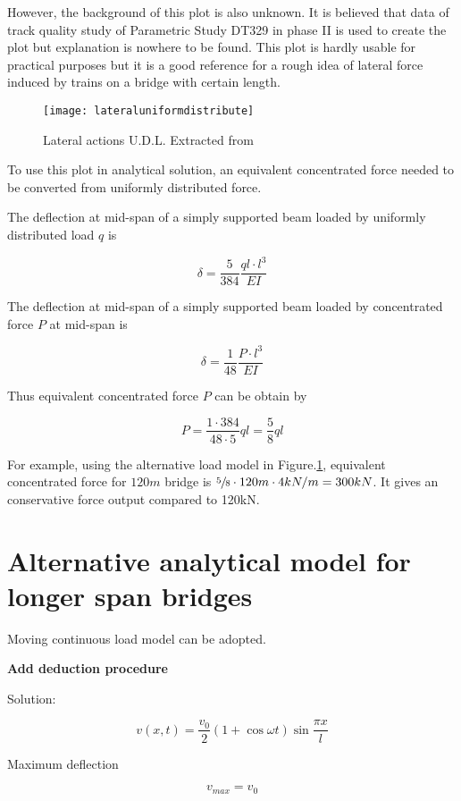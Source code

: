 However, the background of this plot is also unknown. It is believed that data of track quality study of Parametric Study DT329\cite{d181dt329} in phase II is used to create the plot but explanation is nowhere to be found. This plot is hardly usable for practical purposes but it is a good reference for a rough idea of lateral force induced by trains on a bridge with certain length.

\begin{figure}[h!]
    \centering
    \texttt{[image: lateraluniformdistribute]}
    \caption{Lateral actions U.D.L. Extracted from \cite[Figure.4.1]{d181} }
    \label{fig:lateralUDL}
\end{figure}

To use this plot in analytical solution, an equivalent concentrated force needed to be converted from uniformly distributed force.

The deflection at mid-span of a simply supported beam loaded by uniformly distributed load $q$ is

$$ \delta = \frac{5}{384} \frac{ql\cdot l^3}{EI} $$

The deflection at mid-span of a simply supported beam loaded by concentrated force $P$ at mid-span is

$$ \delta = \frac{1}{48} \frac{P\cdot l^3}{EI} $$

Thus equivalent concentrated force $P$ can be obtain by 

$$P = \frac{1 \cdot 384}{48 \cdot 5} ql = \frac{5}{8}ql$$

For example, using the alternative load model in Figure.\ref{fig:lateralUDL}, equivalent concentrated force for $120m$ bridge is $\sfrac{5}{8}\cdot 120m \cdot 4kN/m=300kN$. It gives an conservative force output compared to 120kN.

\section{Alternative analytical model for longer span bridges}
Moving continuous load model can be adopted.

\textbf{Add deduction procedure}

Solution:

\begin{equation}
    v(x,t) = \frac{v_0}{2}(1+\cos \omega t)\sin \frac{\pi x}{l}
\end{equation}

Maximum deflection

\begin{equation}
    v_{max} = v_0
\end{equation}

